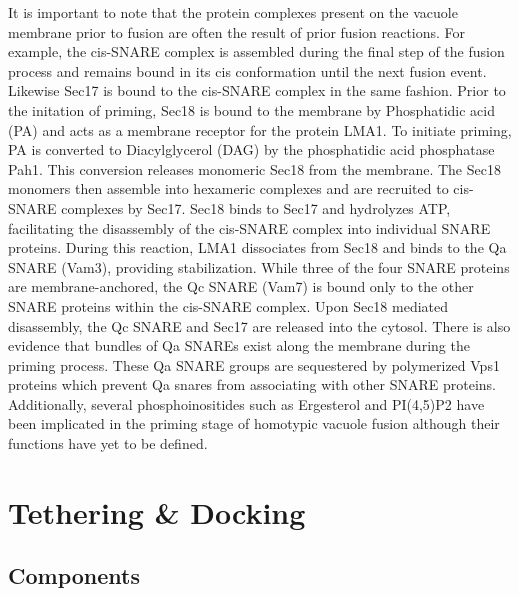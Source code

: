 \documentclass[12pt,twoside]{reedthesis}
\begin{document}
It is important to note that the protein complexes present on the vacuole membrane prior to fusion are often the result of prior fusion reactions. For example, the cis-SNARE complex is assembled during the final step of the fusion process and remains bound in its cis conformation until the next fusion event. Likewise Sec17 is bound to the cis-SNARE complex in the same fashion. Prior to the initation of priming, Sec18 is bound to the membrane by Phosphatidic acid (PA) and acts as a membrane receptor for the protein LMA1. To initiate priming, PA is converted to Diacylglycerol (DAG) by the phosphatidic acid phosphatase Pah1. This conversion releases monomeric Sec18 from the membrane. The Sec18 monomers then assemble into hexameric complexes and are recruited to cis-SNARE complexes by Sec17. Sec18 binds to Sec17 and hydrolyzes ATP, facilitating the disassembly of the cis-SNARE complex into individual SNARE proteins. During this reaction, LMA1 dissociates from Sec18 and binds to the Qa SNARE (Vam3), providing stabilization. While three of the four SNARE proteins are membrane-anchored, the Qc SNARE (Vam7) is bound only to the other SNARE proteins within the cis-SNARE complex. Upon Sec18 mediated disassembly, the Qc SNARE and Sec17 are released into the cytosol. There is also evidence that bundles of Qa SNAREs exist along the membrane during the priming process. These Qa SNARE groups are sequestered by polymerized Vps1 proteins which prevent Qa snares from associating with other SNARE proteins. Additionally, several phosphoinositides such as Ergesterol and PI(4,5)P2 have been implicated in the priming stage of homotypic vacuole fusion although their functions have yet to be defined.

\section{Tethering \& Docking}\label{tethering-docking}

\subsection{Components}\label{components-1}
\end{document}
